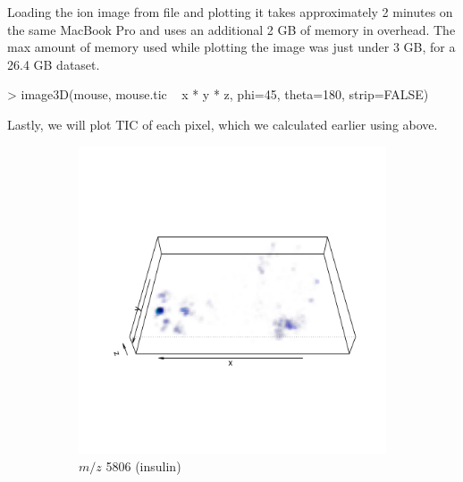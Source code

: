 \documentclass[a4paper]{article}
\begin{document}
Loading the ion image from file and plotting it takes approximately 2 minutes on the same MacBook Pro and uses an additional 2 GB of memory in overhead. The max amount of memory used while plotting the image was just under 3 GB, for a 26.4 GB dataset.

\begin{Schunk}
\begin{Sinput}
> image3D(mouse, mouse.tic ~ x * y * z, phi=45, theta=180, strip=FALSE)
\end{Sinput}
\end{Schunk}

Lastly, we will plot TIC of each pixel, which we calculated earlier using  above.

\begin{figure}[h]
\centering
\begin{subfigure}{.4\textwidth}
  \centering
\includegraphics{matter-extra-010}
\caption{\small $m/z$ 5806 (insulin)}
\label{fig:mz5806}
\end{subfigure}
\begin{subfigure}{.4\textwidth}
  \centering

\end{subfigure}
\end{figure}
\end{document}
